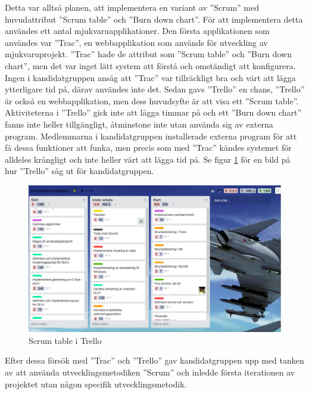 \newline
\newline
Detta var alltså planen, att implementera en variant av ''Scrum'' med huvudattribut ''Scrum table'' och ''Burn down chart''. För att implementera detta användes ett antal mjukvaruapplikationer. Den första applikationen som användes var ''Trac'', en webbapplikation som används för utveckling av mjukvaruprojekt. ''Trac'' hade de attribut som ''Scrum table'' och ''Burn down chart'', men det var  inget lätt system att förstå och omständigt att konfigurera. Ingen i kandidatgruppen ansåg att ''Trac'' var tillräckligt bra och värt att lägga ytterligare tid på, därav användes inte det. Sedan gavs ''Trello'' en chans, ''Trello'' är också en webbapplikation, men dess huvudsyfte är att visa ett ''Scrum table''. Aktiviteterna i ''Trello'' gick inte att lägga timmar på och ett ''Burn down chart'' fanns inte heller tillgängligt, åtminstone inte utan använda sig av externa program. Medlemmarna i kandidatgruppen installerade externa program för att få dessa funktioner att funka, men precis som med ''Trac'' kändes systemet för alldeles krångligt och inte heller värt att lägga tid på. Se figur \ref{fig:trello} för en bild på hur ''Trello'' såg ut för kandidatgruppen.

\begin{figure}[h]
\centerline{\includegraphics[scale=0.3]{grafik/trello}}
\caption{Scrum table i Trello}
\label{fig:trello}
\end{figure}

\noindent Efter dessa försök med ''Trac'' och ''Trello'' gav kandidatgruppen upp med tanken av att använda utvecklingsmetodiken ''Scrum'' och inledde första iterationen av projektet utan någon specifik utvecklingsmetodik.


